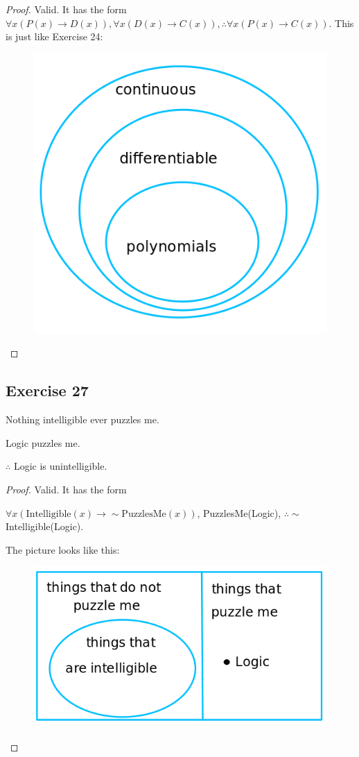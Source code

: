\documentclass[14pt]{extarticle}
\newcommand{\fa}{\forall}
\begin{document}
\begin{proof}
Valid. It has the form $\fa x (P(x) \to D(x)), \fa x (D(x) \to C(x)), \therefore \fa x (P(x) \to C(x))$. This is just like Exercise 24:

\begin{figure}[ht!]
\centering
\includegraphics[scale=0.3]{../images/3.4.26.png}
\end{figure}
\end{proof}

\subsection{Exercise 27}
Nothing intelligible ever puzzles me.

Logic puzzles me.

$\therefore$ Logic is unintelligible.

\begin{proof}
Valid. It has the form 

$\fa x (\text{Intelligible}(x) \to \sim \text{PuzzlesMe}(x))$, PuzzlesMe(Logic), $\therefore \sim$Intelligible(Logic). 

The picture looks like this:

\begin{figure}[ht!]
\centering
\includegraphics[scale=0.4]{../images/3.4.27.png}
\end{figure}
\end{proof}
\end{document}
